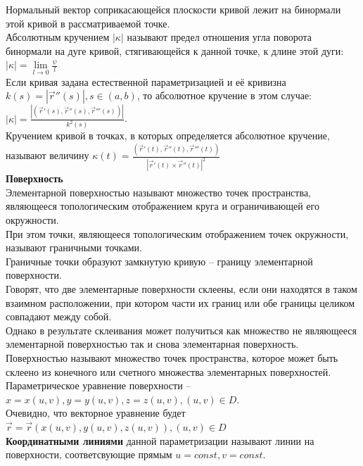 \documentclass{report}
\begin{document}
\noindent
Нормальный вектор соприкасающейся плоскости кривой лежит на бинормали
этой кривой в рассматриваемой точке.\\
Абсолютным кручением $ |\kappa| $ называют предел отношения угла поворота бинормали
на дуге кривой, стягивающейся к данной точке, к длине этой дуги: 
$ |\kappa| = \lim\limits_{l \to 0}{\frac{\psi}{l}} $\\
Если кривая задана естественной параметризацией и её кривизна 
$k(s) = |\overrightarrow{r}''(s)|, s \in (a, b)$, то абсолютное кручение в этом случае:
$|\kappa| = \frac{|(\overrightarrow{r}'(s), \overrightarrow{r}''(s), \overrightarrow{r}'''(s))|}
{k^2(s)}$.\\
Кручением кривой в точках, в которых определяется абсолютное кручение, называют величину
$\kappa(t) = \frac{(\overrightarrow{r}'(t), \overrightarrow{r}''(t), \overrightarrow{r}'''(t))}
{|\overrightarrow{r}'(t) \times \overrightarrow{r}''(t)|^2}$\\


\noindent
\textbf{Поверхность}\\
Элементарной поверхностью называют множество точек пространства, являющееся топологическим
отображением круга и ограничивающей его окружности.\\
При этом точки, являющееся топологическим отображением точек окружности, называют
граничными точками.\\
Граничные точки образуют замкнутую кривую -- границу элементарной поверхности.\\
Говорят, что две элементарные поверхности склеены, если они находятся в таком взаимном
расположении, при котором части их границ или обе границы целиком совпадают между собой.\\
Однако в результате склеивания может получиться как множество не являющееся элементарной
поверхностью так и снова элементарная поверхность.\\
Поверхностью называют множество точек пространства, которое может быть склеено из конечного
или счетного множества элементарных поверхностей.\\
Параметрическое уравнение поверхности -- $x = x(u, v), y = y(u, v), z = z(u, v), (u, v) \in D$.\\
Очевидно, что векторное уравнение будет $\overrightarrow{r} = \overrightarrow{r}(x(u, v), y(u, v),
z(u, v)), (u, v) \in D$\\

\noindent
\textbf{Координатными линиями} данной параметризации называют линии на поверхности,
соответсвующие прямым $u = const, v = const$.\\
\end{document}

